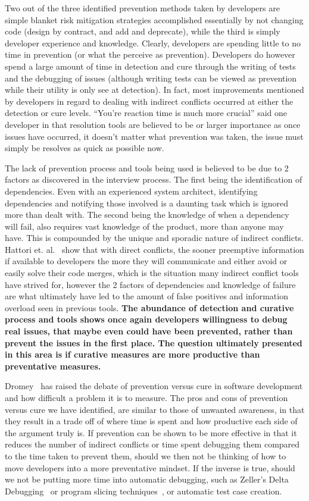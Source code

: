 \documentclass[conference]{IEEEtran}
\begin{document}
Two out of the three identified prevention methods taken by developers are simple blanket risk mitigation strategies
accomplished essentially by
not changing code (design by contract, and add and deprecate), while the third is simply developer experience and knowledge. Clearly,
developers are spending little to no time in prevention (or what the perceive as prevention). Developers do however spend a
large amount of time in detection and cure through the
writing of tests and the debugging of issues (although writing tests can be viewed as prevention while their utility is only see at detection).
In fact, most improvements mentioned by developers in regard to dealing with indirect
conflicts occurred at either the detection or cure levels. ``You're reaction time is much more crucial''
said one developer in that resolution tools are believed to be or larger importance as once issues have occurred, it doesn't
matter what prevention was taken, the issue must simply be resolves as quick as possible now.

The lack of prevention process and tools being used is believed to be due to 2 factors as discovered in the interview process.
The first being the identification of dependencies.
Even with an experienced system architect, identifying dependencies and notifying those involved is a daunting task
which is ignored more than dealt with. The second being the knowledge of when a dependency will fail, also requires vast knowledge
of the product, more than anyone may have. This is compounded by the unique and sporadic nature of indirect conflicts.
Hattori et. al.~\cite{Hattori:2012:ICG} show that with direct conflicts, the
sooner preemptive information if available to developers the more they will communicate and either avoid or easily solve their code merges,
which is the situation many indirect conflict tools have strived for, however the 2 factors of dependencies and knowledge of failure
are what ultimately have led to the amount of false positives and information overload seen in previous tools. \textbf{The
abundance of detection and curative process and tools shows once again developers willingness to debug
real issues, that maybe even could have been prevented, rather than prevent the issues in the first place. The question ultimately
presented in this area is if curative measures are more productive than preventative measures.}

Dromey~\cite{Dromey:2003} has raised the debate of prevention versus cure in software development and how difficult a problem it is
to measure. The pros and cons of prevention versus cure we have identified, are similar to those of unwanted awareness,
in that they result in a trade off
of where time is spent and how productive each side of the argument truly is. If prevention can be shown to be more effective in that
it reduces the number of indirect conflicts or time spent debugging them compared to the time taken to prevent them, should we then
not be thinking of how to move developers into a more preventative mindset. If the inverse is true, should we not be putting more time into automatic debugging, such as
Zeller's Delta Debugging~\cite{Zeller:2002:ICC} or program slicing techniques~\cite{Weiser:1982:PUS}, or automatic test case creation.
\end{document}
